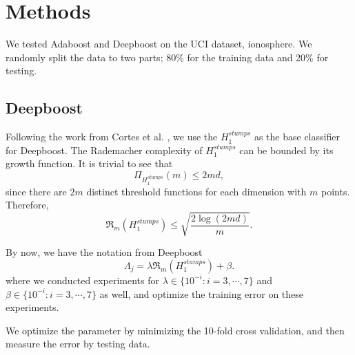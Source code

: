 \section{Methods}
We tested Adaboost and Deepboost on the UCI dataset, ionosphere\cite{Lichman2013}. We randomly split the data to two parts; 80\% for the training data and 20\% for testing.

\subsection{Deepboost}
Following the work from Cortes et al. \cite{cortes2014deep}, we use the $H_1^{stumps}$ as the base classifier for Deepboost.
The Rademacher complexity of $H_1^{stumps}$ can be bounded by its growth function.
It is trivial to see that
\[\Pi_{H_1^{stumps}}(m) \leq 2md,\]
since there are $2m$ distinct threshold functions for each dimension with $m$ points. Therefore,
\[\mathfrak{R}_m (H_1^{stumps})\leq \sqrt{\frac{2\log (2md)}{m}}.\]

By now, we have the notation from Deepboost
\[\Lambda_j=\lambda\mathfrak{R}_m (H_1^{stumps}) +\beta.\]
where we conducted experiments for $\lambda \in \{10^{-i}:i=3,\cdots, 7\}$ and $\beta \in \{10^{-i}:i=3,\cdots, 7\}$ as well, and optimize the training error on these experiments.

We optimize the parameter by minimizing the 10-fold cross validation, and then measure the error by testing data.
